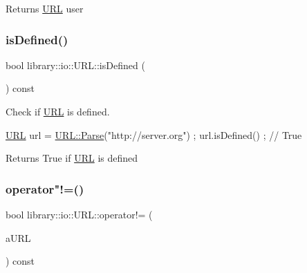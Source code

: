 \begin{DoxyReturn}{Returns}
\hyperlink{classlibrary_1_1io_1_1_u_r_l}{U\+RL} user 
\end{DoxyReturn}
\mbox{\label{classlibrary_1_1io_1_1_u_r_l_af0f1c5720acae0e2bd71404a35199546}} 
\subsubsection{\texorpdfstring{is\+Defined()}{isDefined()}}
{\footnotesize\ttfamily bool library\+::io\+::\+U\+R\+L\+::is\+Defined (\begin{DoxyParamCaption}{ }\end{DoxyParamCaption}) const}



Check if \hyperlink{classlibrary_1_1io_1_1_u_r_l}{U\+RL} is defined. 


\begin{DoxyCode}
\hyperlink{classlibrary_1_1io_1_1_u_r_l_a7e9c070138a6dbd000ffb10b7cd8a5c4}{URL} url = \hyperlink{classlibrary_1_1io_1_1_u_r_l_a98cf42141cf75e1dd5362eb208a1e2bd}{URL::Parse}(\textcolor{stringliteral}{"http://server.org"}) ;
url.isDefined() ; \textcolor{comment}{// True}
\end{DoxyCode}


\begin{DoxyReturn}{Returns}
True if \hyperlink{classlibrary_1_1io_1_1_u_r_l}{U\+RL} is defined 
\end{DoxyReturn}
\mbox{\label{classlibrary_1_1io_1_1_u_r_l_a821743d11216826fa475d9b87f37e6cb}} 
\subsubsection{\texorpdfstring{operator"!=()}{operator!=()}}
{\footnotesize\ttfamily bool library\+::io\+::\+U\+R\+L\+::operator!= (\begin{DoxyParamCaption}\item[{const \hyperlink{classlibrary_1_1io_1_1_u_r_l}{U\+RL} \&}]{a\+U\+RL }\end{DoxyParamCaption}) const}



